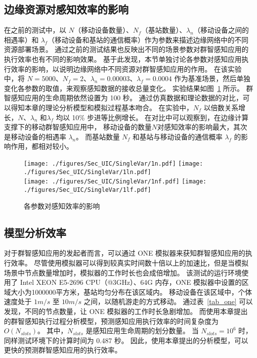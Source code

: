 \subsection{边缘资源对感知效率的影响}

在之前的测试中，以 $N$（移动设备数量）、$N_f$（基站数量）、$\lambda_n$（移动设备之间的相遇率）和 $\lambda_f$（移动设备和基站的通信概率）作为参数来描述边缘网络中的不同资源部署场景。
通过之前的测试结果也反映出不同的场景参数对群智感知应用的执行效率也有不同的影响效果。
基于此发现，本节单独讨论各参数对感知应用执行效率的影响，以说明边缘网络中不同资源对群智感知应用的作用。
在该实验中，将 $N=5000$、$N_f=2$、$\lambda_n = 0.00003$、$\lambda_f=0.0004$ 作为基准场景，然后单独变化各参数的取值，来观察感知数据的接收总量变化。
实验结果如图~\ref{Figure_SingleValTest} 所示。
群智感知应用的生命周期依然设置为 100 秒。
通过仿真数据和理论数据的对比，可以得知本章的理论分析模型和模拟过程基本吻合。
在实验中，$N_f$ 以倍数关系增长，$N$、$\lambda_n$ 和$\lambda_f$ 均以 10\% 步进等比例增长。
在对比中可以观察到，在边缘计算支撑下的移动群智感知应用中，
移动设备的数量$N$对感知效率的影响最大，其次是移动设备的相遇率 $\lambda_n$。
而基站数量 $N_f$ 和基站与移动设备的通信概率 $\lambda_f$ 的影响作用，都相对较小。

\begin{figure}[!h]
  \centering
	\vspace{-1em}
	{\texttt{[image: ./figures/Sec\_UIC/SingleVar/1n.pdf]}}
	{\texttt{[image: ./figures/Sec\_UIC/SingleVar/1ln.pdf]}}\\
	{\texttt{[image: ./figures/Sec\_UIC/SingleVar/1nf.pdf]}}
	{\texttt{[image: ./figures/Sec\_UIC/SingleVar/1lf.pdf]}}
	\vspace{-1em}
	\caption{各参数对感知效率的影响}
	\vspace{-1.5em}
	\label{Figure_SingleValTest}
\end{figure}

\subsection{模型分析效率}

对于群智感知应用的发起者而言，可以通过 ONE 模拟器来获知群智感知应用的执行效率。
尽管使用模拟器可以得到较真实时间数十倍以上的加速比，但是当模拟场景中节点数量增加时，模拟器的工作时长也会成倍增加。
该测试的运行环境使用了 Intel XEON E5-2696 CPU（@3GHz）、64G 内存，ONE 模拟器中设置的区域大小为1000000平方米，基站均匀分布在该区域内。
移动设备在该区域中，个体速度处于 $1m/s$ 至 $10m/s$ 之间，以随机游走的方式移动。
通过表~\ref{tab_one} 可以发现，不同的节点数量，让 ONE 模拟器的工作时长急剧增加。
而使用本章提出的群智感知执行过程分析模型，预测感知应用执行效率的时间复杂度为 $O(N_{slots})$。
其中，$N_{slots}$ 是感知应用生命周期的划分数量。
当 $N_{slots} = 10^6$ 时，同样测试环境下的计算时间为 0.487 秒。
因此，使用本章提出的分析模型，可以更快的预测群智感知应用的执行效率。

